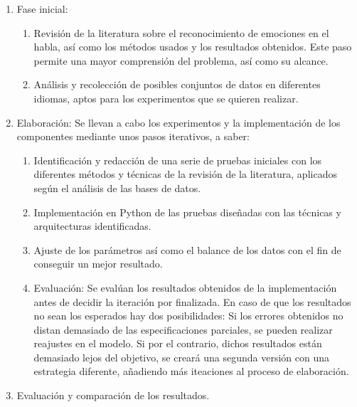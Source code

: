 \documentclass[11pt,a4paper,spanish]{book}
\begin{document}
	\begin{enumerate}
		\item Fase inicial: 
		\begin{enumerate}
			\item Revisión de la literatura sobre el reconocimiento de emociones en el habla, así como los métodos usados y los resultados obtenidos. Este paso permite una mayor comprensión del problema, así como su alcance.
			
			\item Análisis y recolección de posibles conjuntos de datos en diferentes idiomas, aptos para los experimentos que se quieren realizar.

		\end{enumerate}
	
		\item Elaboración: Se llevan a cabo los experimentos y la implementación de los componentes mediante unos pasos iterativos, a saber:
		
			\begin{enumerate}
				
				\item Identificación y redacción de una serie de pruebas iniciales con los diferentes métodos y técnicas de la revisión de la literatura, aplicados según el análisis de las bases de datos.
				
				\item Implementación en Python de las pruebas diseñadas con las técnicas y arquitecturas identificadas.
				
				\item Ajuste de los parámetros así como el balance de los datos con el fin de conseguir un mejor resultado.
				
				\item Evaluación: Se evalúan los resultados obtenidos de la implementación antes de decidir la iteración por finalizada. En caso de que los resultados no sean los esperados hay dos posibilidades: Si los errores obtenidos no distan demasiado de las especificaciones parciales, se pueden realizar reajustes en el modelo. Si por el contrario, dichos resultados están demasiado lejos del objetivo, se creará una segunda versión con una estrategia diferente, añadiendo más iteaciones al proceso de elaboración.
			\end{enumerate} 
		
		\item Evaluación y comparación de los resultados.

	\end{enumerate}
\end{document}
